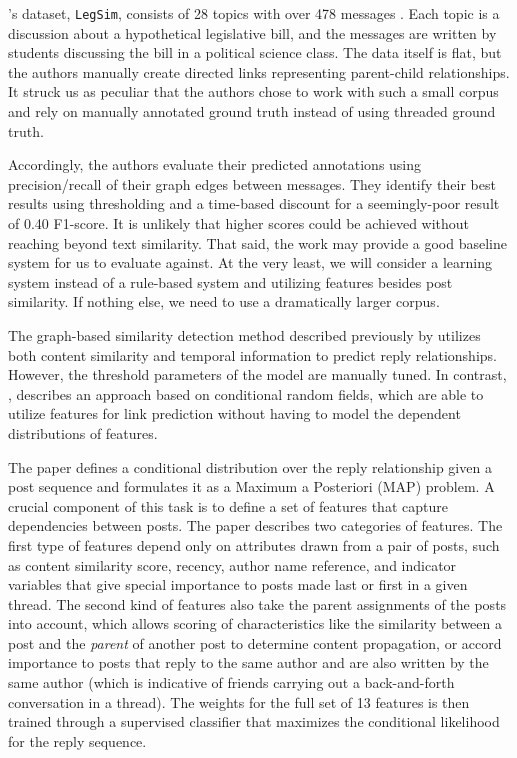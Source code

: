 \documentclass{article}
\begin{document}
\cite{Wang2008a}'s dataset, \texttt{LegSim}, consists of 28 topics with over 
478 messages . Each topic is a discussion about a hypothetical legislative bill, 
and the messages are written by students discussing the bill in a political science class. 
The data itself is flat, but the authors manually create directed links representing
parent-child relationships. It struck us as peculiar that the authors chose to work
with such a small corpus and rely on manually annotated ground truth instead of using
threaded ground truth.

Accordingly, the authors evaluate their predicted annotations using precision/recall of
their graph edges between messages. They identify their best results using
thresholding and a time-based discount for a seemingly-poor result of 0.40 
F1-score. It is unlikely that higher scores could be achieved without reaching
beyond text similarity. That said, the work may provide a good baseline system
for us to evaluate against. At the very least, we will consider a learning
system instead of a rule-based system and utilizing features besides post
similarity.  If nothing else, we need to use a dramatically larger corpus.

The graph-based similarity detection method described previously by
\cite{Wang2008a} utilizes both content similarity and temporal information to
predict reply relationships. However, the threshold parameters of the model are
manually tuned. In contrast, \cite{Wang2011}, describes an approach based on conditional random
fields, which are able to utilize features for link prediction
without having to model the dependent distributions of features.

The \cite{Wang2011} paper defines a conditional distribution over the reply
relationship given a post sequence and formulates it as a Maximum a Posteriori
(MAP) problem. A crucial component of this task is to define a set of features
that capture dependencies between posts. The paper describes two categories of
features. The first type of features depend only on attributes drawn from a pair
of posts, such as content similarity score, recency, author name reference, and
indicator variables that give special importance to posts made last or first in
a given thread. The second kind of features also take the parent assignments of
the posts into account, which allows scoring of characteristics like the
similarity between a post and the \emph{parent} of another post to determine
content propagation, or accord importance to posts that reply to the same author
and are also written by the same author (which is indicative of friends carrying
out a back-and-forth conversation in a thread). The weights for the full set of
13 features is then trained through a supervised classifier that maximizes the
conditional likelihood for the reply sequence.
\end{document}
